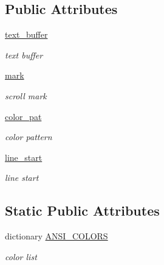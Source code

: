\subsection*{Public Attributes}
\begin{DoxyCompactItemize}
\item 
\hyperlink{classvisualizer_1_1ipython__view_1_1ConsoleView_af41c734d92634ed48bb4265c383aa12a}{text\+\_\+buffer}
\begin{DoxyCompactList}\small\item\em text buffer \end{DoxyCompactList}\item 
\hyperlink{classvisualizer_1_1ipython__view_1_1ConsoleView_a8e2760df8ab32c588ad92c3fd6a65fd5}{mark}
\begin{DoxyCompactList}\small\item\em scroll mark \end{DoxyCompactList}\item 
\hyperlink{classvisualizer_1_1ipython__view_1_1ConsoleView_a9d43382a2506937e365f52365dde79a4}{color\+\_\+pat}
\begin{DoxyCompactList}\small\item\em color pattern \end{DoxyCompactList}\item 
\hyperlink{classvisualizer_1_1ipython__view_1_1ConsoleView_a9593fe742cea9fb6fb0a2f15400a9a11}{line\+\_\+start}
\begin{DoxyCompactList}\small\item\em line start \end{DoxyCompactList}\end{DoxyCompactItemize}
\subsection*{Static Public Attributes}
\begin{DoxyCompactItemize}
\item 
dictionary \hyperlink{classvisualizer_1_1ipython__view_1_1ConsoleView_a48b8c29be2e81f0e3c66d91bfc2f4edf}{A\+N\+S\+I\+\_\+\+C\+O\+L\+O\+RS}
\begin{DoxyCompactList}\small\item\em color list \end{DoxyCompactList}\end{DoxyCompactItemize}
